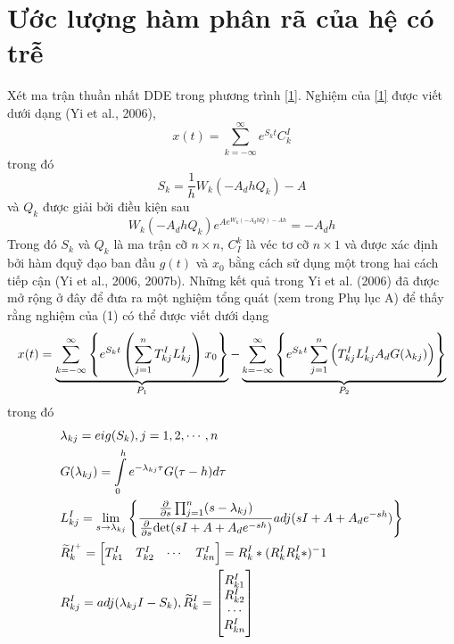 \section{Ước lượng hàm phân rã của hệ có trễ}
Xét ma trận thuần nhất DDE trong phương trình \eqref{1}. Nghiệm của \eqref{1} được viết dưới dạng (Yi et al., 2006),
%
\begin{equation}\label{8}
	x(t) = \sum_{k = -\infty}^{\infty} e^{S_kt}C_k^I
\end{equation}
%  
trong đó
%
\begin{equation}\label{9}
	S_k = \dfrac{1}{h} W_k(-A_dhQ_k) -A
\end{equation} 
%
và $Q_k$  được giải bởi điều kiện sau
%
\begin{equation}\label{10}
	W_k(-A_dhQ_k)e^{Ae^{W_k(-A_dhQ)-Ah}} = -A_dh
\end{equation}
%
Trong đó $S_k$ và $Q_k$ là ma trận cỡ $n \times n$, $C_I^k$ là véc tơ cỡ $n \times 1$ và được xác định bởi hàm đquỹ đạo ban đầu $g(t)$ và $x_0$ bằng cách sử dụng một trong hai cách tiếp cận (Yi et al., 2006, 2007b).
%
Những kết quả trong Yi et al. (2006) đã được mở rộng ở đây để đưa ra một nghiệm tổng quát (xem trong Phụ lục A) để thấy rằng nghiệm của (1) có thể được viết dưới dạng
%
\begin{equation}\label{11}
	x(t) = \underbrace{\sum_{k = -\infty}^{\infty} \left\{e^{S_k t} \left( \sum_{j=1}^{n} T^I_{kj} L^I_{kj} \right)x_0 \right\}}_{P_1} - \underbrace{\sum_{k = -\infty}^{\infty} \left\{e^{S_k t} \sum_{j=1}^{n} \left(T^I_{kj} L^I_{kj} A_d G(\lambda_{kj}) \right)\right\}}_{P_2}
\end{equation}
%
trong đó
%
\begin{align}\label{12}
	&\lb_{kj}=eig(S_k), j = 1,2,\cdots, n\\
%
	&G(\lb_{kj})= \int \limits^h_0 e^{-\lb_{kj}\tau} G(\tau - h) d \tau\\
%	
	&L^I_{kj} = \lim\limits_{s\to \lb_{kj}}	\left\{ \dfrac{\frac{\partial }{\partial s} \prod_{j=1}^{n} (s - \lb_{kj})}{\frac{\partial }{\partial s} \text{det} (s I + A + A_d e^{-sh})} adj(s I + A + A_d e^{-sh}) \right\}\\
% 
	& \tR^{I^+}_k = \begin{bmatrix}
		T_{k1}^I & T_{k2}^I & \cdots & T_{kn}^I
	\end{bmatrix} = R^I_k*(R^I_k R^I_k*)^-1\\
%
	& R_{kj}^I = adj (\lb_{kj}I - S_k), \tR_k^I = \m{R^I_{k1} \\R^I_{k2} \\  \cdots \\R^I_{kn} }
\end{align}
